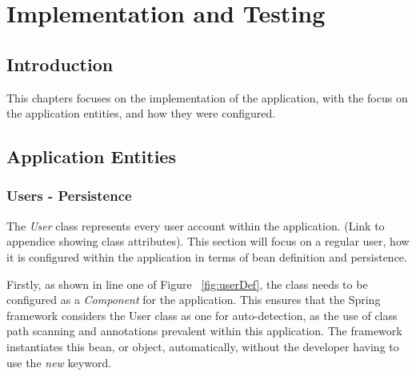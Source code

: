 \chapter{Implementation and Testing}
\label{impltesting}

\section{Introduction}

This chapters focuses on the implementation of the application, with the focus on the application entities, and how they were configured.

\section{Application Entities}
\subsection{Users - Persistence}

The \textit{User} class represents every user account within the application. (Link to appendice showing class attributes). This section will focus on a regular user, how it is configured within the application in terms of bean definition and persistence. 

Firstly, as shown in line one of Figure ~\ref{fig:userDef}, the class needs to be configured as a \textit{Component} for the application. This ensures that the Spring framework considers the User class as one for auto-detection, as the use of class path scanning and annotations prevalent within this application. The framework instantiates this bean, or object, automatically, without the developer having to use the \textit{new} keyword.

